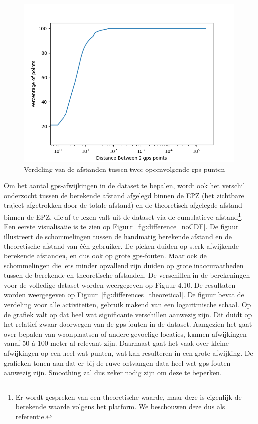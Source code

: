 \begin{figure}[h]
    \centering
    \includegraphics[width=\textwidth]{fig/Afwijkingen&Analyses/Graphs/Afstand tussen 2 gps-punten.png}
    \caption{Verdeling van de afstanden tussen twee opeenvolgende gps-punten}\label{fig:distance_between_gps_points_CDF}
\end{figure}

Om het aantal \ac{gps}-afwijkingen in de dataset te bepalen, wordt ook het
verschil onderzocht tussen de berekende afstand afgelegd binnen de \ac{EPZ}
(het zichtbare traject afgetrokken door de totale afstand) en de theoretisch
afgelegde afstand binnen de \ac{EPZ}, die af te lezen valt uit de dataset via
de cumulatieve afstand\footnote{Er wordt gesproken van een theoretische waarde,
    maar deze is eigenlijk de berekende waarde volgens het platform. We beschouwen
    deze dus als referentie.}. Een eerste visualisatie is te zien op
Figuur~\ref{fig:difference_noCDF}. De figuur illustreert de schommelingen
tussen de handmatig berekende afstand en de theoretische afstand van één
gebruiker. De pieken duiden op sterk afwijkende berekende afstanden, en dus ook
op grote \ac{gps}-fouten. Maar ook de schommelingen die iets minder opvallend
zijn duiden op grote inaccuraatheden tussen de berekende en theoretische
afstanden. De verschillen in de berekeningen voor de volledige dataset worden
weergegeven op Figuur 4.10. De resultaten worden weergegeven op
Figuur~\ref{fig:differences_theoretical}. De figuur bevat de verdeling voor
alle activiteiten, gebruik makend van een logaritmische schaal. Op de grafiek
valt op dat heel wat significante verschillen aanwezig zijn. Dit duidt op het
relatief zwaar doorwegen van de \ac{gps}-fouten in de dataset. Aangezien het
gaat over bepalen van woonplaatsen of andere gevoelige locaties, kunnen
afwijkingen vanaf 50 à 100 meter al relevant zijn. Daarnaast gaat het vaak over
kleine afwijkingen op een heel wat punten, wat kan resulteren in een grote
afwijking. De grafieken tonen aan dat er bij de ruwe ontvangen data heel wat
\ac{gps}-fouten aanwezig zijn. Smoothing zal dus zeker nodig zijn om deze te
beperken.

